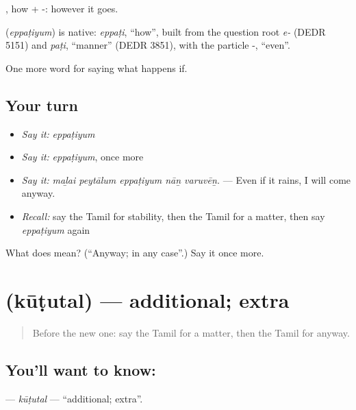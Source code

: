 , how + -: however it goes.

\begin{cousinweb}
\textbf{} (\emph{eppaṭiyum}) is native: \emph{eppaṭi}, \textquotedblleft{}how\textquotedblright{}, built from the question root \emph{e-} (DEDR 5151) and \emph{paṭi}, \textquotedblleft{}manner\textquotedblright{} (DEDR 3851), with the particle -, \textquotedblleft{}even\textquotedblright{}.
\end{cousinweb}

\begin{grammarlens}[title={What you've built}]
One more word for saying what happens if.
\end{grammarlens}

\subsection*{Your turn}
\begin{itemize}
\raggedright
  \item \emph{Say it:} \emph{eppaṭiyum}
  \item \emph{Say it:} \emph{eppaṭiyum}, once more
  \item \emph{Say it:} \emph{maḻai peytālum eppaṭiyum nāṉ varuvēṉ.} — Even if it rains, I will come anyway.
  \item \emph{Recall:} say the Tamil for stability, then the Tamil for a matter, then say \emph{eppaṭiyum} again
\end{itemize}

\begin{tcolorbox}[breakable,colback=teal!4,colframe=teal!35!black,title={Before you move on}]
What does  mean? (\textquotedblleft{}Anyway; in any case\textquotedblright{}.) Say it once more.
\end{tcolorbox}
\section[\texorpdfstring{\ta{கூடுதல்} (kūṭutal)}{கூடுதல் (kūṭutal)}]{ (kūṭutal) — additional; extra}

\label{lesson:TA-C399-kututal}



\begin{quote}
Before the new one: say the Tamil for a matter, then the Tamil for anyway.
\end{quote}

\subsection*{You'll want to know: }
\textbf{} — \emph{kūṭutal} — \textquotedblleft{}additional; extra\textquotedblright{}.

